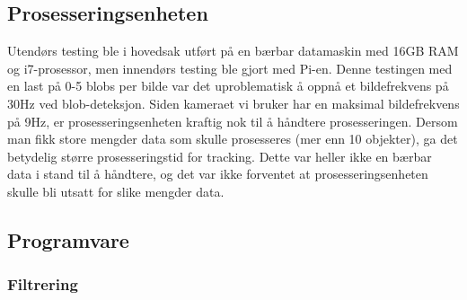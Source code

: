\subsection{Prosesseringsenheten}
Utendørs testing ble i hovedsak utført på en bærbar datamaskin med 16GB RAM og i7-prosessor, men innendørs testing ble gjort med Pi-en.
Denne testingen med en last på 0-5 blobs per bilde var det uproblematisk å oppnå et bildefrekvens på 30Hz ved blob-deteksjon. 
Siden kameraet vi bruker har en maksimal bildefrekvens på 9Hz, er prosesseringsenheten kraftig nok til å håndtere prosesseringen.
Dersom man fikk store mengder data som skulle prosesseres (mer enn 10 objekter), ga det betydelig større prosesseringstid for tracking. 
Dette var heller ikke en bærbar data i stand til å håndtere, og det var ikke forventet at prosesseringsenheten skulle bli utsatt for slike mengder data.




\newpage
\subsection{Programvare}\label{sec:verifikasjon:programvare}

\subsubsection{Filtrering}\label{sec:verifikasjon:programvare:filtrering}

